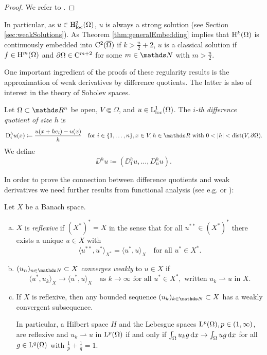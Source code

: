 \begin{proof}
  We refer to \cite[Theorems 1-6 in Section 6.3 and Theorem 6 in Section 6.2]{evans2010partial}.
\end{proof}

In particular, as $u \in \mathrm{H}_{\operatorname{loc}}^2(\Omega)$, $u$ is always a strong solution (see Section \ref{sec:weakSolutions}).
As Theorem \ref{thm:generalEmbedding} implies that $\mathrm{H}^k(\Omega)$ is continuously embedded into $\mathrm{C}^2(\overline\Omega)$ if $k > \frac{n}{2} + 2$, $u$ is a classical solution if $f \in \mathrm{H}^m(\Omega)$ and $\partial\Omega \in \mathrm{C}^{m + 2}$ for some $m \in \N$ with $m > \frac{n}{2}$.

One important ingredient of the proofs of these regularity results is the approximation of weak derivatives by difference quotients.
The latter is also of interest in the theory of Sobolev spaces.

\begin{defn}
  Let $\Omega \subset \R^n$ be open, $V \Subset \Omega$, and $u \in \mathrm{L}^1_{\operatorname{loc}}(\Omega)$.
  The \emph{$i$-th difference quotient of size $h$} is
  $$
  \DD_i^h u(x) \coloneqq \frac{u(x + he_i) - u(x)}{h} \quad\text{for } i \in \{1, \dots,n\}, x \in V, h \in \R \text{ with } 0 < |h| < \dist(V, \partial \Omega).
  $$
  We define
  $$
  \DD^h u\coloneqq ( \DD_1^h u, \dots,D_n^h u).
  $$
\end{defn}

In order to prove the connection between difference quotients and weak derivatives we need further results from functional analysis (see e.g. \cite{dobrowolski2010angewandte} or \cite{alt2012lineare}):

\begin{prop}
  \label{prop:banachAlaoglu}
  Let $X$ be a Banach space.
  \begin{enumerate}[a)]
    \item $X$ is \emph{reflexive} if $(X^*)^* = X$ in the sense that for all $u^{**} \in (X^*)^*$ there exists a unique $u \in X$ with
      $$
      \langle u^{**}, u^* \rangle_{X^*} = \langle u^*, u \rangle_X \quad\text{for all } u^* \in X^*.
      $$
    \item $(u_n)_{n \in \N} \subset X$ \emph{converges weakly} to $u \in X$ if 
      $$
      \langle u^*, u_k \rangle_X \to \langle u^*, u \rangle_X \quad\text{as } k\to \infty \text{ for all } u^* \in X^*, \text{ written } u_k \rightharpoonup u \text{ in } X.
      $$
    \item If $X$ is reflexive, then any bounded sequence $(u_k)_{k \in \N} \subset X$ has a weakly convergent subsequence.

      In particular, a Hilbert space $H$ and the Lebesgue spaces $\mathrm{L}^p(\Omega), p \in (1,\infty)$, are reflexive and $u_k \rightharpoonup u$ in $\mathrm{L}^p(\Omega)$ if and only if $\int_\Omega u_k g \, {\operatorname{d}\!{x}} \to \int_\Omega u g \, {\operatorname{d}\!{x}}$ for all $g \in \mathrm{L}^q(\Omega)$ with $\frac{1}{p} + \frac{1}{q} = 1$.
  \end{enumerate}
\end{prop}

